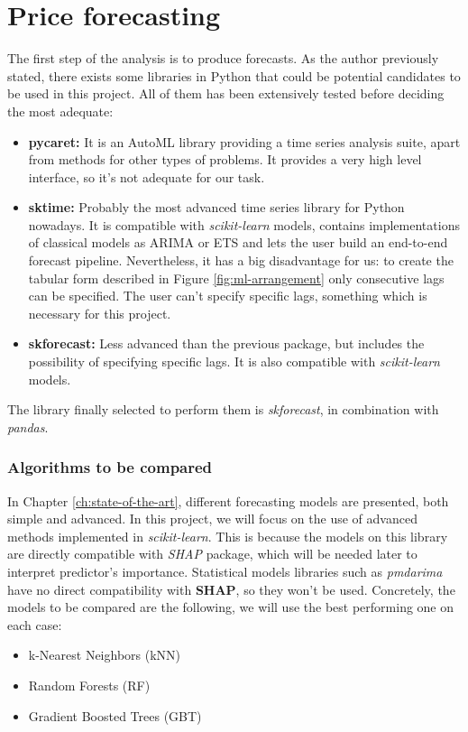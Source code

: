 \section{Price forecasting}
The first step of the analysis is to produce forecasts. As the author previously stated, there exists some libraries in Python that could be potential candidates to be used in this project. All of them has been extensively tested before deciding the most adequate:
\begin{itemize}
    \item \textbf{pycaret\cite{PyCaret}:} It is an AutoML library providing a time series analysis suite, apart from methods for other types of problems. It provides a very high level interface, so it's not adequate for our task.
    \item \textbf{sktime:} Probably the most advanced time series library for Python nowadays. It is compatible with \textit{scikit-learn}\cite{scikit-learn} models, contains implementations of classical models as ARIMA or ETS and lets the user build an end-to-end forecast pipeline. Nevertheless, it has a big disadvantage for us: to create the tabular form described in Figure \ref{fig:ml-arrangement} only consecutive lags can be specified. The user can't specify specific lags, something which is necessary for this project.
    \item \textbf{skforecast\cite{skforecast}:} Less advanced than the previous package, but includes the possibility of specifying specific lags. It is also compatible with \textit{scikit-learn} models.
\end{itemize}

The library finally selected to perform them is \textit{skforecast}, in combination with \textit{pandas}.

\subsubsection{Algorithms to be compared}
In Chapter \ref{ch:state-of-the-art}, different forecasting models are presented, both simple and advanced. In this project, we will focus on the use of advanced methods implemented in \textit{scikit-learn}. This is because the models on this library are directly compatible with \textit{SHAP}\cite{shap-package} package, which will be needed later to interpret predictor's importance. Statistical models libraries such as \textit{pmdarima}\cite{pmdarima} have no direct compatibility with \textbf{SHAP}, so they won't be used. Concretely, the models to be compared are the following, we will use the best performing one on each case:
\begin{itemize}
    \item k-Nearest Neighbors (kNN)
    \item Random Forests (RF)
    \item Gradient Boosted Trees (GBT)
\end{itemize}

